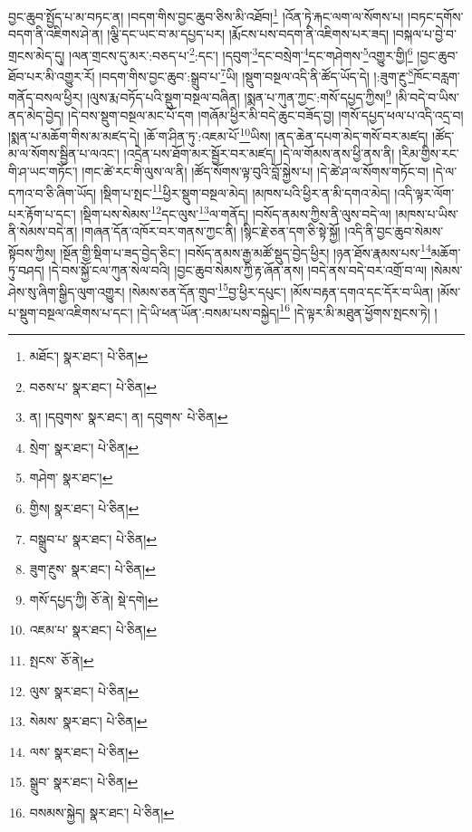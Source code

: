 བྱང་ཆུབ་སྤྱོད་པ་མ་བཏང་ན། །བདག་གིས་བྱང་ཆུབ་ཅིས་མི་འཐོབ།\footnote{མཐོང་།  སྣར་ཐང་།  པེ་ཅིན། } །འོན་ཏེ་རྐང་ལག་ལ་སོགས་པ། །བཏང་དགོས་བདག་ནི་འཇིགས་ཤེ་ན། །ལྕི་དང་ཡང་བ་མ་དཔྱད་པར། །རྨོངས་པས་བདག་ནི་འཇིགས་པར་ཟད། །བསྐལ་པ་བྱེ་བ་གྲངས་མེད་དུ། །ལན་གྲངས་དུ་མར་:བཅད་པ་\footnote{བཅས་པ་  སྣར་ཐང་།  པེ་ཅིན། }:དང་། །དབུག་\footnote{ན། །དབུགས་  སྣར་ཐང་། ན། དབུགས་  པེ་ཅིན། }དང་བསྲེག་\footnote{སྲེག་  སྣར་ཐང་།  པེ་ཅིན། }དང་གཤེགས་\footnote{གཤེག་  སྣར་ཐང་། }འགྱུར་གྱི།\footnote{གྱིས།  སྣར་ཐང་།  པེ་ཅིན། } །བྱང་ཆུབ་ཐོབ་པར་མི་འགྱུར་རོ། །བདག་གིས་བྱང་ཆུབ་:སྒྲུབ་པ་\footnote{བསྒྲུབ་པ་  སྣར་ཐང་།  པེ་ཅིན། }ཡི། །སྡུག་བསྔལ་འདི་ནི་ཚོད་ཡོད་དེ། །:ཟུག་རྔུ་\footnote{ཟུག་རྔུས་  སྣར་ཐང་།  པེ་ཅིན། }ཁོང་བརླག་གནོད་བསལ་ཕྱིར། །ལུས་རྨ་བཏོད་པའི་སྡུག་བསྔལ་བཞིན། །སྨན་པ་ཀུན་ཀྱང་:གསོ་དཔྱད་ཀྱིས།\footnote{གསོ་དཔྱད་ཀྱི།  ཅོ་ནེ།  སྡེ་དགེ། } །མི་བདེ་བ་ཡིས་ནད་མེད་བྱེད། །དེ་བས་སྡུག་བསྔལ་མང་པོ་དག །གཞོམ་ཕྱིར་མི་བདེ་ཆུང་བཟོད་བྱ། །གསོ་དཔྱད་ཕལ་པ་འདི་འདྲ་བ། །སྨན་པ་མཆོག་གིས་མ་མཛད་དེ། །ཆོ་ག་ཤིན་ཏུ་:འཇམ་པོ་\footnote{འཇམ་པ་  སྣར་ཐང་།  པེ་ཅིན། }ཡིས། །ནད་ཆེན་དཔག་མེད་གསོ་བར་མཛད། །ཚོད་མ་ལ་སོགས་སྦྱིན་པ་ལའང་། །འདྲེན་པས་ཐོག་མར་སྦྱོར་བར་མཛད། །དེ་ལ་གོམས་ནས་ཕྱི་ནས་ནི། །རིམ་གྱིས་རང་གི་ཤ་ཡང་གཏོང་། །གང་ཚེ་རང་གི་ལུས་ལ་ནི། །ཚོད་སོགས་ལྟ་བུའི་བློ་སྐྱེས་པ། །དེ་ཚེ་ཤ་ལ་སོགས་གཏོང་བ། །དེ་ལ་དཀའ་བ་ཅི་ཞིག་ཡོད། །སྡིག་པ་སྤང་\footnote{སྤངས་  ཅོ་ནེ། }ཕྱིར་སྡུག་བསྔལ་མེད། །མཁས་པའི་ཕྱིར་ན་མི་དགའ་མེད། །འདི་ལྟར་ལོག་པར་རྟོག་པ་དང་། །སྡིག་པས་སེམས་\footnote{ལུས་  སྣར་ཐང་།  པེ་ཅིན། }དང་ལུས་\footnote{སེམས་  སྣར་ཐང་།  པེ་ཅིན། }ལ་གནོད། །བསོད་ནམས་ཀྱིས་ནི་ལུས་བདེ་ལ། །མཁས་པ་ཡིས་ནི་སེམས་བདེ་ན། །གཞན་དོན་འཁོར་བར་གནས་ཀྱང་ནི། །སྙིང་རྗེ་ཅན་དག་ཅི་སྟེ་སྐྱོ། །འདི་ནི་བྱང་ཆུབ་སེམས་སྟོབས་ཀྱིས། །སྔོན་གྱི་སྡིག་པ་ཟད་བྱེད་ཅིང་། །བསོད་ནམས་རྒྱ་མཚོ་སྡུད་བྱེད་ཕྱིར། །ཉན་ཐོས་རྣམས་པས་\footnote{ལས་  སྣར་ཐང་།  པེ་ཅིན། }མཆོག་ཏུ་བཤད། །དེ་བས་སྐྱོ་ངལ་ཀུན་སེལ་བའི། །བྱང་ཆུབ་སེམས་ཀྱི་རྟ་ཞོན་ནས། །བདེ་ནས་བདེ་བར་འགྲོ་བ་ལ། །སེམས་ཤེས་སུ་ཞིག་སྒྱིད་ལུག་འགྱུར། །སེམས་ཅན་དོན་གྲུབ་\footnote{སྒྲུབ་  སྣར་ཐང་།  པེ་ཅིན། }བྱ་ཕྱིར་དཔུང་། །མོས་བརྟན་དགའ་དང་དོར་བ་ཡིན། །མོས་པ་སྡུག་བསྔལ་འཇིགས་པ་དང་། །དེ་ཡི་ཕན་ཡོན་:བསམ་པས་བསྐྱེད།\footnote{བསམས་སྐྱེད།  སྣར་ཐང་།  པེ་ཅིན། } །དེ་ལྟར་མི་མཐུན་ཕྱོགས་སྤངས་ཏེ། །
